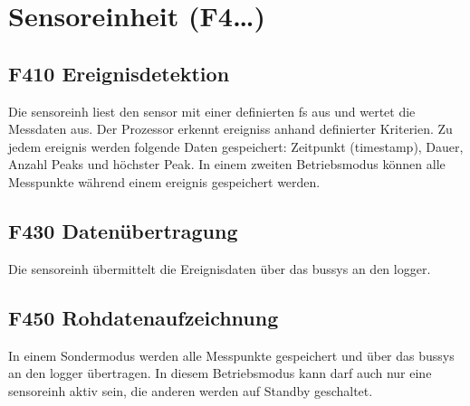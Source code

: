 \section{Sensoreinheit (F4\ldots)}


\subsection{F410 Ereignisdetektion}
Die \gls{sensoreinh} liest den \gls{sensor} mit einer definierten \gls{fs} aus und wertet die Messdaten aus. Der Prozessor erkennt \glspl{ereignis} anhand definierter Kriterien. Zu jedem \gls{ereignis} werden folgende Daten gespeichert: Zeitpunkt (\gls{timestamp}), Dauer, Anzahl Peaks und höchster Peak. In einem zweiten Betriebsmodus können alle Messpunkte während einem \gls{ereignis} gespeichert werden.


\subsection{F430 Datenübertragung}
Die \gls{sensoreinh} übermittelt die Ereignisdaten über das \gls{bussys} an den \gls{logger}.


\subsection{F450 Rohdatenaufzeichnung}
In einem Sondermodus werden alle Messpunkte gespeichert und über das \gls{bussys} an den \gls{logger} übertragen. In diesem Betriebsmodus kann darf auch nur eine \gls{sensoreinh} aktiv sein, die anderen werden auf Standby geschaltet.


